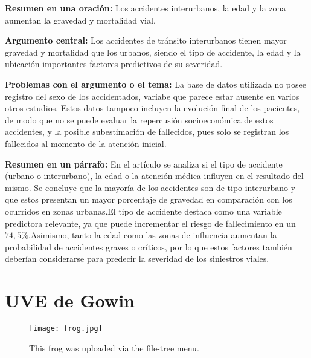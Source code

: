 \documentclass{book}
\begin{document}
\textbf{Resumen en una oración:} Los accidentes interurbanos, la edad y la zona aumentan la gravedad y mortalidad vial.

\textbf{Argumento central:} Los accidentes de tránsito interurbanos tienen mayor gravedad y mortalidad que los urbanos, siendo el tipo de accidente, la edad y la ubicación importantes factores predictivos de su severidad.

\textbf{Problemas con el argumento o el tema:} La base de datos utilizada no posee registro del sexo de los accidentados, variabe que parece estar ausente en varios otros estudios. Estos datos tampoco incluyen la evolución final de los pacientes, de modo que no se puede evaluar la repercusión socioeconómica de estos accidentes, y la posible subestimación de fallecidos, pues solo se registran los fallecidos al momento de la atención inicial.

\textbf{Resumen en un párrafo:} En el artículo se analiza si el tipo de accidente (urbano o interurbano), la edad o la atención médica influyen en el resultado del mismo. Se concluye que la mayoría de los accidentes son de tipo interurbano y que estos presentan un mayor porcentaje de gravedad en comparación con los ocurridos en zonas urbanas.El tipo de accidente destaca como una variable predictora relevante, ya que puede incrementar el riesgo de fallecimiento en un $74,5\%$.Asimismo, tanto la edad como las zonas de influencia aumentan la probabilidad de accidentes graves o críticos, por lo que estos factores también deberían considerarse para predecir la severidad de los siniestros viales.

\section{UVE de Gowin}

\begin{figure}
\centering
\texttt{[image: frog.jpg]}
\caption{\label{fig:frog}This frog was uploaded via the file-tree menu.}
\end{figure}



\nocite{*}
\end{document}
